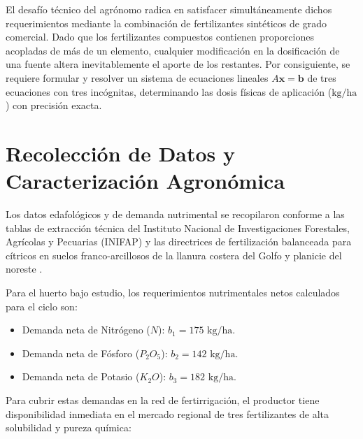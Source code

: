 El desafío técnico del agrónomo radica en satisfacer simultáneamente dichos requerimientos mediante la combinación de fertilizantes sintéticos de grado comercial. Dado que los fertilizantes compuestos contienen proporciones acopladas de más de un elemento, cualquier modificación en la dosificación de una fuente altera inevitablemente el aporte de los restantes. Por consiguiente, se requiere formular y resolver un sistema de ecuaciones lineales $A\mathbf{x} = \mathbf{b}$ de tres ecuaciones con tres incógnitas, determinando las dosis físicas de aplicación ($\text{kg/ha}$) con precisión exacta.

\section{Recolección de Datos y Caracterización Agronómica}

Los datos edafológicos y de demanda nutrimental se recopilaron conforme a las tablas de extracción técnica del Instituto Nacional de Investigaciones Forestales, Agrícolas y Pecuarias (INIFAP) y las directrices de fertilización balanceada para cítricos en suelos franco-arcillosos de la llanura costera del Golfo y planicie del noreste \parencite{umn2024fertilizing}.

Para el huerto bajo estudio, los requerimientos nutrimentales netos calculados para el ciclo son:

\begin{itemize}

    \item Demanda neta de Nitrógeno ($N$): $b_1 = 175\text{ kg/ha}$.

    \item Demanda neta de Fósforo ($P_2O_5$): $b_2 = 142\text{ kg/ha}$.

    \item Demanda neta de Potasio ($K_2O$): $b_3 = 182\text{ kg/ha}$.

\end{itemize}

Para cubrir estas demandas en la red de fertirrigación, el productor tiene disponibilidad inmediata en el mercado regional de tres fertilizantes de alta solubilidad y pureza química:

